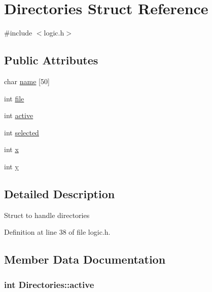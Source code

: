 \hypertarget{struct_directories}{}\section{Directories Struct Reference}
\label{struct_directories}


{\ttfamily \#include $<$logic.\+h$>$}

\subsection*{Public Attributes}
\begin{DoxyCompactItemize}
\item 
char \hyperlink{struct_directories_aae723f6aa314a2df92c9ea19c28301a1}{name} \mbox{[}50\mbox{]}
\item 
int \hyperlink{struct_directories_a529919d407f91236d922e90fb7b32075}{file}
\item 
int \hyperlink{struct_directories_aabdf5f705ba6376e41ba31e2592085bd}{active}
\item 
int \hyperlink{struct_directories_af134855edabe4e235ed3d9795ed9d782}{selected}
\item 
int \hyperlink{struct_directories_a1ffa14b21b6ef553947c36a4a2984ff8}{x}
\item 
int \hyperlink{struct_directories_a6e528ed9c4b7a2411a925b83b37185cd}{y}
\end{DoxyCompactItemize}


\subsection{Detailed Description}
Struct to handle directories 

Definition at line 38 of file logic.\+h.



\subsection{Member Data Documentation}
\hypertarget{struct_directories_aabdf5f705ba6376e41ba31e2592085bd}{}
\subsubsection[{active}]{\setlength{\rightskip}{0pt plus 5cm}int Directories\+::active}\label{struct_directories_aabdf5f705ba6376e41ba31e2592085bd}


